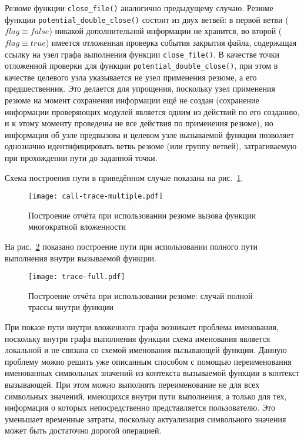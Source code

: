 Резюме функции \texttt{close\_file()} аналогично предыдущему случаю. Резюме функции \texttt{potential\_double\_close()} состоит из двух ветвей: в первой ветви ($flag \equiv false$) никакой дополнительной информации не хранится, во второй ($flag \equiv true$) имеется отложенная проверка события закрытия файла, содержащая ссылку на узел  графа выполнения функции \texttt{close\_file()}. В качестве точки отложенной проверки для функции \texttt{potential\_double\_close()}, при этом в качестве целевого узла указывается не узел применения резюме, а его предшественник. Это делается для упрощения, поскольку узел применения резюме на момент сохранения информации ещё не создан (сохранение информации проверяющих модулей является одним из действий по его созданию, и к этому моменту проведены не все действия по применения резюме), но информация об узле предвызова и целевом узле вызываемой функции позволяет однозначно идентифицировать ветвь резюме (или группу ветвей), затрагиваемую при прохождении пути до заданной точки.

Схема построения пути в приведённом случае показана на рис.~\ref{pic:call-trace-multiple}.

\begin{figure}
   \centering
   \texttt{[image: call-trace-multiple.pdf]}
   \caption{Построение отчёта при использовании резюме вызова функции многократной вложенности}\label{pic:call-trace-multiple}
\end{figure}


На рис.~\ref{pic:trace-full} показано построение пути при использовании полного пути выполнения внутри вызываемой функции.

\begin{figure}
   \centering
   \texttt{[image: trace-full.pdf]}
   \caption{Построение отчёта при использовании резюме: случай полной трассы внутри функции}\label{pic:trace-full}
\end{figure}


При показе пути внутри вложенного графа возникает проблема именования, поскольку внутри графа выполнения функции схема именования является локальной и не связана со схемой именования вызывающей функции. Данную проблему можно решить уже описанным способом с помощью переименования именованных символьных значений из контекста вызываемой функции в контекст вызывающей. При этом можно выполнять переименование не для всех символьных значений, имеющихся внутри пути выполнения, а только для тех, информация о которых непосредственно представляется пользователю. Это уменьшает временные затраты, поскольку актуализация символьного значения может быть достаточно дорогой операцией.


